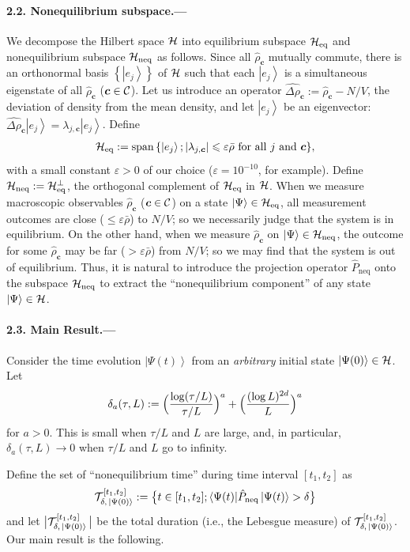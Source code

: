 \documentclass[aps,prl,superscriptaddress,reprint]{revtex4-2}
\newcommand{\se}[1]{\paragraph{#1.---}}
\DeclareMathOperator{\Span}{span}
\theoremstyle{definition}
\newcommand{\abs}[1]{{\left\vert #1 \right\vert}}
\newcommand{\Bigparen}[1]{\Bigl({#1}\Bigr)}
\newcommand{\brac}[1]{{\left\{ #1 \right\}}}
\newcommand{\HH}{{\cal H}}
\newcommand{\CC}{{\cal C}}
\newcommand{\TT}{{\cal T}}
\newcommand{\ba}[1]{\bar{#1}}
\newcommand{\ket}[1]{\left|{#1}\right\rangle}
\newcommand{\bra}[1]{\langle{#1}|}
\newcommand{\ha}{\hat}
\newcommand{\wh}{\widehat}
\newcommand{\De}{\varDelta}
\newcommand{\ep}{\varepsilon}
\renewcommand{\l}{\lambda}
\renewcommand{\r}{\rho}
\newcommand{\f}{\frac}
\newcommand{\ve}[1]{\boldsymbol{#1}}
\renewcommand{\le}{\leqslant}
\newcommand{\tx}{\text}
\newcommand{\eqb}{_{\text{eq}}}
\newcommand{\neqb}{_\mathrm{neq}}
\newcommand{\nqb}{\neqb}
\newcommand{\eql}{equilibrium}
\newcommand{\nql}{nonequilibrium}
\newcommand{\noneq}{nonequilibrium}
\newcommand{\bd}{\delta}
\begin{document}
\se{2.2. Nonequilibrium subspace}
We decompose the Hilbert space $\HH$ into
{\eql} subspace $\HH\eqb$ and {\nql} subspace $\HH\neqb$ as follows.
Since all $\ha\r_{\ve c}$ mutually commute,
there is an orthonormal basis $\brac{\ket{e_ j}}$ of $\HH$
such that each
$\ket{e_ j}$ is a simultaneous eigenstate of all $\ha\r_{\ve c}$ ($\ve c\in\CC$).
Let us introduce an operator
$\wh{\De\r}_{\ve c}:=\ha\r_{\ve c}-N/V$,
the deviation of density from the mean density, and
let $\ket{e_ j}$ be an eigenvector:
$\wh{\De\r}_{\ve c}
\ket{e_ j}=\l_{j,\ve c}\ket{e_ j}$.
Define
\begin{align}
  	\HH\eqb:=\Span
  	\brac{\ket{e_j}; \abs{ \l_{j,\ve c} }\le \ep \ba \r
  	\tx{ for all } j\tx{ and } \ve c},
\end{align}
with a small constant $\ep>0$ of our choice
($\ep=10^{-10}$, for example).
Define $\HH\neqb:=\HH\eqb^\perp$,
the orthogonal complement of $\HH\eqb$ in $\HH$.
When we measure macroscopic observables $\ha\r_{\ve c}$
($\ve c\in\CC$)
on a state $\ket\Psi\in\HH\eqb$,
all measurement outcomes are close ($\le\ep\ba\r$) to $N/V$;
so we necessarily judge that the system is in equilibrium.
On the other hand, when we measure $\ha\r_{\ve c}$ on
$\ket\Psi\in\HH\nqb$,
the outcome for some $\ha\r_{\ve c}$ may be
far ($>\ep\ba\r$) from $N/V$; so
we may find that the system is out of equilibrium.
Thus, it is natural to introduce the projection operator
$\ha P\nqb$ onto the subspace $\HH\nqb$ to extract the
``{\noneq} component'' of any state $\ket\Psi\in\HH$.


\se{2.3. Main Result}
Consider the time evolution
$\ket{\Psi(t)}$ from an
\emph{arbitrary} initial state $\ket{\Psi(0)}\in\HH$.
Let
\begin{align}
	\bd_a(\tau,L):=
  	\Bigparen{ \f{\log(\tau/L)}{\tau/L} }^a
  	+ \Bigparen{ \f{(\log L)^{2d}}L }^a
  	\label{eq-bd}
\end{align}
for $a>0$.
This is small when $\tau/L$ and $L$ are large,
and, in particular,
$\bd_{a}(\tau,L)\to0$ when $\tau/L$ and $L$ go to infinity.


Define the set of ``{\noneq} time'' during time interval $[t_1, t_2]$ as
\begin{align}
  	\TT^{[t_1, t_2]}_{\delta, \,\ket{\Psi(0)}}
  	:=
  	\bigl \{ t\in[t_1, t_2];
 	\bra{\Psi(t)}\ha P\nqb\ket{\Psi(t)} >  \delta \bigr \}
\end{align}
and let $\bigl | \TT^{[t_1, t_2]}_{\delta, \,\ket{\Psi(0)}} \, \bigr |$
be the total duration (i.e., the Lebesgue measure) of $ \TT^{[t_1, t_2]}_{\delta, \,\ket{\Psi(0)}}$.
Our main result is the following.
\end{document}
